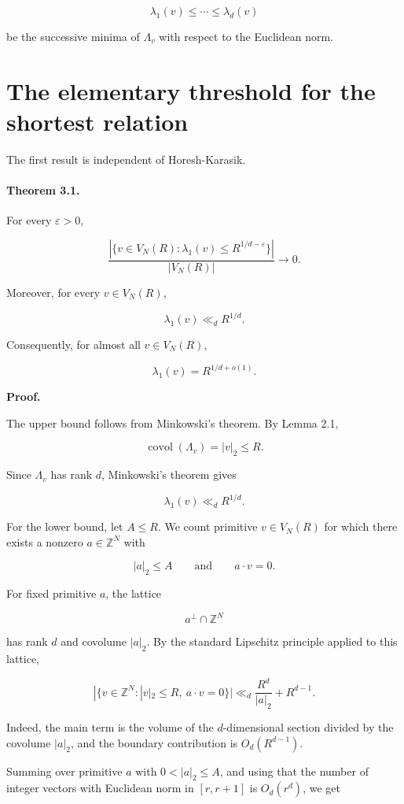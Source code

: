 \documentclass[11pt]{article}
\begin{document}
\[
\lambda_1(v)\le\cdots\le\lambda_d(v)
\]

be the successive minima of $\Lambda_v$ with respect to the Euclidean norm.

\section{The elementary threshold for the shortest relation}

The first result is independent of Horesh-Karasik.

\paragraph{Theorem 3.1.}

For every $\varepsilon>0$,

\[
\frac{
|\{v\in V_N(R):\lambda_1(v)\le R^{1/d-\varepsilon}\}|
}{
|V_N(R)|
}
\longrightarrow0.
\]

Moreover, for every $v\in V_N(R)$,

\[
\lambda_1(v)\ll_d R^{1/d}.
\]

Consequently, for almost all $v\in V_N(R)$,

\[
\lambda_1(v)=R^{1/d+o(1)}.
\]

\noindent\textbf{Proof.}

The upper bound follows from Minkowski's theorem. By Lemma 2.1,

\[
\operatorname{covol}(\Lambda_v)=|v|_2\le R.
\]

Since $\Lambda_v$ has rank $d$, Minkowski's theorem gives

\[
\lambda_1(v)\ll_d R^{1/d}.
\]

For the lower bound, let $A\le R$. We count primitive $v\in V_N(R)$ for which there exists a nonzero $a\in\mathbb Z^N$ with

\[
|a|_2\le A
\qquad\text{and}\qquad
a\cdot v=0.
\]

For fixed primitive $a$, the lattice

\[
a^\perp\cap\mathbb Z^N
\]

has rank $d$ and covolume $|a|_2$. By the standard Lipschitz principle applied to this lattice,

\[
|\{v\in\mathbb Z^N:|v|_2\le R,\ a\cdot v=0\}|
\ll_d
\frac{R^d}{|a|_2}+R^{d-1}.
\]

Indeed, the main term is the volume of the $d$-dimensional section divided by the covolume $|a|_2$, and the boundary contribution is $O_d(R^{d-1})$.

Summing over primitive $a$ with $0<|a|_2\le A$, and using that the number of integer vectors with Euclidean norm in $[r,r+1]$ is $O_d(r^d)$, we get
\end{document}
